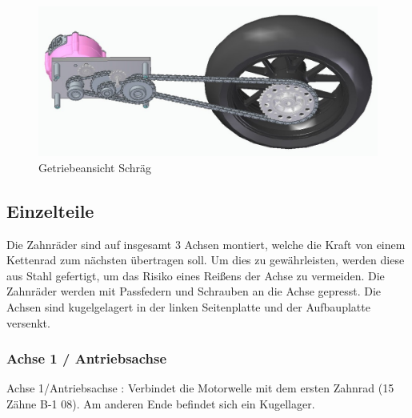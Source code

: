 \begin{figure} [H]
	\begin{center}
		\includegraphics[scale=0.5]{figures/mechanik/Getriebe_2.jpg}
			\caption{Getriebeansicht Schräg}
			\label{fig:Getriebeansicht Schräg}
	\end{center}
\end{figure}

\newpage

\subsection*{Einzelteile}

Die Zahnräder sind auf insgesamt 3 Achsen montiert, welche die Kraft von einem Kettenrad zum nächsten übertragen soll. Um dies zu gewährleisten, werden diese aus Stahl gefertigt, um das Risiko eines Reißens der Achse zu vermeiden. Die Zahnräder werden mit Passfedern und Schrauben an die Achse gepresst. Die Achsen sind kugelgelagert in der linken Seitenplatte und der Aufbauplatte versenkt.

\subsubsection*{Achse 1 / Antriebsachse}

Achse 1/Antriebsachse :	Verbindet die Motorwelle mit dem ersten Zahnrad (15 Zähne B-1 08). Am anderen Ende befindet sich ein Kugellager.

